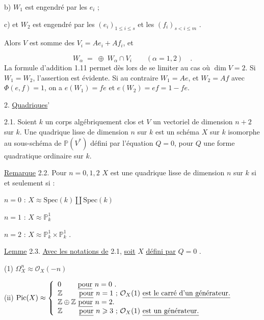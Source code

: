 b) \qquad $W_1$ est engendré par les $e_i$ ;

c) \qquad et $W_2$ est engendré par les $(e_i)_{1 \leqslant i \leqslant s}$ et les $(f_i)_{s < i \leqslant m}$ .

Alors $V$ est somme des $V_i = A e_i + A f_i$, et

\begin{equation*}
W_\alpha \;=\; \oplus \; W_\alpha \cap V_i \qquad (\alpha = 1,2) \quad .
\end{equation*}
La formule d'addition 1.11 permet dès lors de se limiter au cas où $\dim V = 2$. Si $W_1 = W_2$, l'assertion est évidente. Si au contraire $W_1 = Ae$, et $W_2 = Af$ avec $\Phi(e,f) = 1$, on a $e(W_1) = fe$ et $e(W_2) = ef = 1 - fe$.


2. \underline{Quadriques}'

2.1. Soient $k$ un corps algébriquement clos et $V$ un vectoriel de dimension $n+2$ sur $k$. Une quadrique lisse de dimension $n$ sur $k$ est un schéma $X$ sur $k$ isomorphe au sous-schéma de $\mathbb{P}(V^*)$ défini par l'équation $Q=0$, pour $Q$ une forme quadratique ordinaire sur $k$.

\underline{Remarque} 2.2. Pour $n = 0,1,2$ $X$ est une quadrique lisse de dimension $n$ sur $k$ si et seulement si :

$n = 0$ \qquad : \qquad $X \approx \mathrm{Spec}(k) \amalg \mathrm{Spec}(k)$

$n = 1$ \qquad : \qquad $X \approx \mathbb{P}^1_k$

$n = 2$ \qquad : \qquad $X \approx \mathbb{P}^1_k \times \mathbb{P}^1_k$ .



\underline{Lemme} 2.3. \underline{Avec les notations de} 2.1, \underline{soit} $X$ \underline{défini par} $Q = 0$ .

(1) \qquad $\Omega^n_X \approx \mathcal{O}_X(-n)$

(ii) \quad $\mathrm{Pic}(X) \approx \left\{ \begin{array}{l} \mbox{$0$ \qquad \underline{pour} $n = 0$ .} \\ \mbox{$\mathbb{Z}$ \qquad \underline{pour} $n = 1$ ; $\mathcal{O}_X(1)$ \underline{est le carré d'un générateur.}} \\ \mbox{$\mathbb{Z} \oplus \mathbb{Z}$ \underline{pour} $n =2$.} \\ \mbox{$\mathbb{Z}$ \qquad \underline{pour} $n \geqslant 3$ ; $\mathcal{O}_X(1)$ \underline{est un générateur.}} \end{array} \right.$

